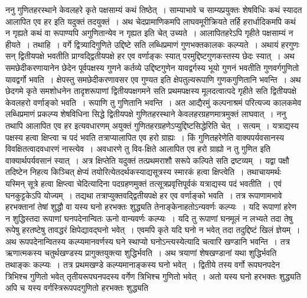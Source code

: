 \documentclass[11pt, openany]{book}
\begin{document}
\vspace{-3mm}
 ननु गुणितहरस्थाने केवलहरे कृते पक्षसाम्यं कथं तिष्ठेत्~। 
साम्याभावे च साम्यप्रयुक्तः शेषविधिः कथं स्यादत आलापित एव हर 
इति यदुक्तं तदयुक्तं~। अथ चेदप्रामाणिकमपि लाघवमूरीक्रियते तर्हि 
हरार्धादिकमपि कथं न गृह्यते कथं वा रूपाण्यपि अगुणितान्येव न गृह्यत
इति चेत् उच्यते~। आलापितहरेऽपि गृहीते पक्षसाम्यं न हीयते~। 
तथाहि~। वर्गे द्वित्र्यादिगुणिते उद्दिष्टे सति लब्धिप्रमाणं गुणभक्तकालकः
कल्प्यते~। अथायं हरगुणः सन् द्वितीयपक्षे भवतीति प्राग्वद्द्वितीयपक्षे
हर एव वर्णाङ्कः स्यात् परमुद्दिष्टगुणकस्तस्य छेदः स्यात्~। अथ समछेदीकरणायानेन छेदेन पूर्वपक्षस्य गुणने कर्तव्ये उद्दिष्टगुणेन यावद्वर्गस्य 
भूयो गुणनं भवतीति गुणवर्गगुणितो यावद्वर्गो भवति~। क्षेपस्तु समछेदीकरणावसर एव गुण्यत इति क्षेपतुल्यरूपाणि गुणकगुणितानि भवन्ति~। अथ 
छेदगमे कृते समशोधनेन तादृशरूपाणां द्वितीयपक्षगमने सति प्रथमपक्षस्य
मूलदत्वात्पदे गृहीते सति द्वितीयपक्षे केवलहरो वर्णाङ्को भवति~। रूपाणि 
तु गुणितानि भवन्ति~। अत आद्यैरमुं कल्पनाश्रमं परित्यज्य कालकमेव 
लब्धिप्रमाणं प्रकल्प्य शेषविधिना सिद्धे द्वितीयपक्षे गुणितहरस्थाने
केवलहरग्रहणमात्रमुक्तं लाघवात्~। ननु तथापि आलापित एव हर इत्यवधारणम् 
अयुक्तं गुणितहरग्रहणेऽप्युद्दिष्टसिद्धेरिति चेत्~। सत्यम्~। यत्राद्यस्य पक्षस्य 
हत्वा क्षिप्त्वा च पदं भवति तत्राप्यालापित एव हरो ग्राह्यः~। किं
\newpage
\noindent गुणितहरेणेति वाक्यपर्यवसानस्य विवक्षितत्वादवधारणं नास्त्येव~। अवधारणे तु विव-क्षिते आलापित एव हरो ग्राह्यो न तु गुणित इति वाक्यार्थपर्यवसानं
स्यात्~। अत्र क्षिप्तेति यदुक्तं तत्प्रथमराशौ सरूपे कल्पिते सति 
द्रष्टव्यम्~। यद्वा पक्षौ तदिष्टेन निहत्य किञ्चित् क्षेप्यं
तयोरित्येतदर्थकस्याद्यसूत्रस्य स्मारकं हत्वा क्षिप्त्वेति~। तथाचायमर्थः यस्मिन् सूत्रे हत्वा क्षिप्त्वा चेदित्यादिना पदग्रहणमुक्तं तत्सूत्रप्रवृत्तिपूर्वकं यत्राद्यस्य पदं
भवतीति~। एवं घनकुट्टकेऽपि योज्यम्~। तद्यथा तत्राप्युक्तवद्द्वितीयपक्षे हर एव वर्णाङ्को 
भवति~। तत्र रूपाणामभावे हरभक्तानां तेषां शुद्धौ वा यस्य घनो 
हरभक्तः शुद्ध्यति तेनाङ्केनाहतोऽन्यवर्णः कल्प्यः~। यदि रूपाणां हरेण न 
शुद्धिस्तदा रूपाणां घनपदेनान्वितः ऊनो वान्यवर्णः कल्प्यः~। यदि तु 
रूपाणां घनमूलं न लभ्यते तदा तेषु रूपेषु हरतष्टेषु तावद्धरं 
क्षिपेद्यावद्घनो भवेत्~। एवमपि कृते यदि घनो न भवेत् तदा तदुद्दिष्टं
खिलं ज्ञेयम्~। अथ रूपपदेनान्वितस्य कल्प्यमानवर्णस्य घने स्थाप्यो 
घनोऽन्त्यस्येत्यादि चत्वारि खण्डानि भवन्ति~। तत्र ऋणात्मकस्य चतुर्थखण्डस्य प्रागुक्तयुक्त्या शुद्धिर्भवति~। अथ त्रयाणां शेषखण्डानां यथा 
शुद्धिर्भवति तथाङ्कः कल्प्यः~। तत्र प्रथमखण्डे कल्प्यमानाङ्कस्य घनो
भवेत्~। द्वितीये तस्य वर्गो रूपघनपदेन त्रिभिश्च गुणितो भवेत् 
तृतीयरूपघनपदस्य वर्गेण त्रिभिश्च गुणितो भवेत्~। अतो यस्य घनो 
हरभक्तः शुद्ध्यति अपि च यस्य वर्गस्त्रिरूपपदगुणितो हरभक्तः शुद्ध्यति 
\end{document}
